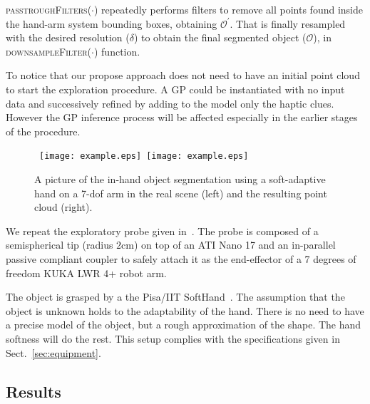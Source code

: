 \textsc{passtroughFilters}($\cdot$) repeatedly performs filters to remove
all points found inside the hand-arm system bounding boxes, obtaining $\mathcal{O^\prime}$.
That is finally resampled with the desired resolution ($\delta$) 
to obtain the final segmented object ($\mathcal{O}$), in \textsc{downsampleFilter}($\cdot$) function.


To notice that our propose approach does not need to have an initial point cloud to start the exploration procedure. A GP could be instantiated with no input data and successively refined by adding to the model only the haptic clues. However the GP inference process will be affected especially in the earlier stages of the procedure.   

\begin{figure}
\centering
  \mbox{
  \texttt{[image: example.eps]}
  \texttt{[image: example.eps]}
  }
  \caption{A picture of the in-hand object segmentation using a soft-adaptive hand on a 7-dof arm in the real scene (left) and the resulting point cloud (right).}
  \label{fig:in-hand-segmentation}
\end{figure}

We repeat the exploratory probe given in~\citet{Rosales2014Active}. The probe is composed of a semispherical tip (radius $2$cm) on top of an ATI Nano 17 and an in-parallel passive compliant coupler to safely attach it as the end-effector of a 7 degrees of freedom KUKA LWR 4+ robot arm.

The object is grasped by a the Pisa/IIT SoftHand~\citet{Catalano2014Adaptive}. The assumption that the object is unknown holds to the adaptability of the hand.
There is no need to have a precise model of the object, but a rough approximation of the shape. The hand softness will do the rest. This setup complies with the specifications given in Sect.~\ref{sec:equipment}.



\subsection{Results}



\label{sec:results}
